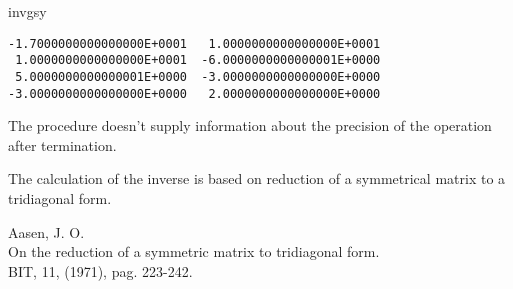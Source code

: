 \documentclass{report}
\newcommand{\References}{\item[References]\rmfamily}
\newcommand{\Method}{\item[Method]\rmfamily}
\newcommand{\Precision}{\item[Precision]\rmfamily}
\begin{document}
\begin{procedure}{invgsy}
\begin{verbatim}
-1.7000000000000000E+0001   1.0000000000000000E+0001
 1.0000000000000000E+0001  -6.0000000000000001E+0000
 5.0000000000000001E+0000  -3.0000000000000000E+0000
-3.0000000000000000E+0000   2.0000000000000000E+0000
\end{verbatim}

\Precision

The procedure doesn't supply information about the precision of the
operation after termination.

\Method

The calculation of the inverse is based on reduction of a symmetrical
matrix to a tridiagonal form.

\References

Aasen, J. O. \\
On the reduction of a symmetric matrix to tridiagonal form. \\
BIT, 11, (1971), pag. 223-242.

\end{procedure}
\end{document}
